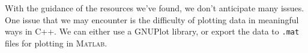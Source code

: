 With the guidance of the resources we've found, we don't anticipate many issues. One issue that we may encounter is the difficulty of plotting data in meaningful ways in C++. We can either use a GNUPlot library, or export the data to \texttt{.mat} files for plotting in \textsc{Matlab}.
